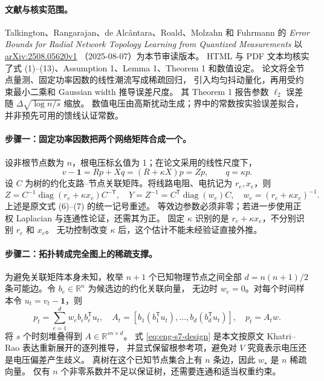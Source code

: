 \documentclass[UTF8,11pt,fontset=fandol]{ctexart}
\theoremstyle{remark}
\numberwithin{equation}{section}
\begin{document}
\paragraph{文献与核实范围。}
Talkington、Rangarajan、de Alcântara、Roald、Molzahn 和 Fuhrmann 的
\emph{Error Bounds for Radial Network Topology Learning from Quantized Measurements}
\citep{S7} 以 \href{https://arxiv.org/html/2508.05620v1}{arXiv:2508.05620v1}
（2025-08-07）为本节审读版本。
HTML 与 PDF 文本均核实了式 (1)--(13)、Assumption 1、Lemma 1、Theorem 1 和数值设定。
论文将全节点量测、固定功率因数的线性潮流写成稀疏回归，
引入均匀抖动量化，再用受约束最小二乘和 Gaussian width 推导误差尺度。
其 Theorem 1 报告参数 $\ell_2$ 误差随 $\Delta\sqrt{\log n/s}$ 缩放。
数值电压由高斯扰动生成；界中的常数按实验误差拟合，并非预先可用的馈线认证常数。

\paragraph{步骤一：固定功率因数把两个网络矩阵合成一个。}
设非根节点数为 $n$，根电压标幺值为 1；在论文采用的线性尺度下，
\begin{equation}
 v-\mathbf1=Rp+Xq=(R+\kappa X)p=Zp,
 \qquad q=\kappa p.
 \label{eq:eng-s7-z}
\end{equation}
设 $C$ 为树的约化支路--节点关联矩阵。将线路电阻、电抗记为 $r_e,x_e$，则
\begin{equation}
 Z=C^{-1}\operatorname{diag}(r_e+\kappa x_e)C^{-\mathsf T},
 \quad Y=Z^{-1}=C^{\mathsf T}\operatorname{diag}(w_e)C,
 \quad w_e=(r_e+\kappa x_e)^{-1}.
 \label{eq:eng-s7-admittance}
\end{equation}
上述是原文式 (6)--(7) 的统一记号重述。
等效边参数必须非零；若进一步使用正权 Laplacian 与连通性论证，还需其为正。
固定 $\kappa$ 识别的是 $r_e+\kappa x_e$，不分别识别 $r_e$ 和 $x_e$。
无功控制改变 $\kappa$ 后，这个估计不能未经验证直接外推。

\paragraph{步骤二：拓扑转成完全图上的稀疏支撑。}
为避免关联矩阵本身未知，枚举 $n+1$ 个已知物理节点之间全部
$d=n(n+1)/2$ 条可能边。令 $b_e\in\mathbb R^n$ 为候选边的约化关联向量，
无边时 $w_e=0$。对每个时间样本令 $u_t=v_t-\mathbf1$，则
\begin{equation}
 p_t=\sum_{e=1}^{d}w_e b_e b_e^{\mathsf T}u_t,
 \quad A_t=[b_1(b_1^{\mathsf T}u_t),\ldots,b_d(b_d^{\mathsf T}u_t)],
 \quad p_t=A_tw.
 \label{eq:eng-s7-design}
\end{equation}
将 $s$ 个时刻堆叠得到 $A\in\mathbb R^{sn\times d}$。
式 \eqref{eq:eng-s7-design} 是本文按原文 Khatri--Rao 表达重新展开的逐列推导，
并显式保留根参考项，避免对 $V$ 究竟表示电压还是电压偏差产生歧义。
真树在这个已知节点集合上有 $n$ 条边，因此 $w_\star$ 是 $n$ 稀疏向量。
仅有 $n$ 个非零系数并不足以保证树，还需要连通和适当权重约束。
\end{document}
